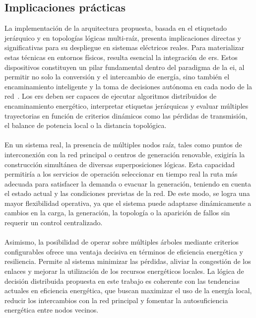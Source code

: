 \subsection{Implicaciones prácticas}
\label{susec:pracImpl}

La implementación de la arquitectura propuesta, basada en el etiquetado jerárquico y en topologías lógicas multi-raíz, presenta implicaciones directas y significativas para su despliegue en sistemas eléctricos reales. Para materializar estas técnicas en entornos físicos, resulta esencial la integración de \glspl{er}. Estos dispositivos constituyen un pilar fundamental dentro del paradigma de la \gls{ei}, al permitir no solo la conversión y el intercambio de energía, sino también el encaminamiento inteligente y la toma de decisiones autónoma en cada nodo de la red~\cite{benchikh2024survey}. Los \glspl{er} deben ser capaces de ejecutar algoritmos distribuidos de encaminamiento energético, interpretar etiquetas jerárquicas y evaluar múltiples trayectorias en función de criterios dinámicos como las pérdidas de transmisión, el balance de potencia local o la distancia topológica.\\
\\
En un sistema real, la presencia de múltiples nodos raíz, tales como puntos de interconexión con la red principal o centros de generación renovable, exigiría la construcción simultánea de diversas superposiciones lógicas. Esta capacidad permitiría a los servicios de operación seleccionar en tiempo real la ruta más adecuada para satisfacer la demanda o evacuar la generación, teniendo en cuenta el estado actual y las condiciones previstas de la red. De este modo, se logra una mayor flexibilidad operativa, ya que el sistema puede adaptarse dinámicamente a cambios en la carga, la generación, la topología o la aparición de fallos sin requerir un control centralizado.\\
\\
Asimismo, la posibilidad de operar sobre múltiples árboles mediante criterios configurables ofrece una ventaja decisiva en términos de eficiencia energética y resiliencia. Permite al sistema minimizar las pérdidas, aliviar la congestión de los enlaces y mejorar la utilización de los recursos energéticos locales. La lógica de decisión distribuida propuesta en este trabajo es coherente con las tendencias actuales en eficiencia energética, que buscan maximizar el uso de la energía local, reducir los intercambios con la red principal y fomentar la autosuficiencia energética entre nodos vecinos.\\

